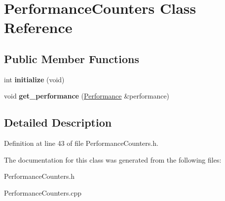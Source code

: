 \hypertarget{classPerformanceCounters}{\section{Performance\-Counters Class Reference}
\label{classPerformanceCounters}
}
\subsection*{Public Member Functions}
\begin{DoxyCompactItemize}
\item 
\hypertarget{classPerformanceCounters_a6da9d4ba5cdc2a27f12c134e3a536612}{int {\bfseries initialize} (void)}\label{classPerformanceCounters_a6da9d4ba5cdc2a27f12c134e3a536612}

\item 
\hypertarget{classPerformanceCounters_aaf18c08421469aa6f5cae87d6a1721dd}{void {\bfseries get\-\_\-performance} (\hyperlink{structPerformance}{Performance} \&performance)}\label{classPerformanceCounters_aaf18c08421469aa6f5cae87d6a1721dd}

\end{DoxyCompactItemize}


\subsection{Detailed Description}


Definition at line 43 of file Performance\-Counters.\-h.



The documentation for this class was generated from the following files\-:\begin{DoxyCompactItemize}
\item 
Performance\-Counters.\-h\item 
Performance\-Counters.\-cpp\end{DoxyCompactItemize}

